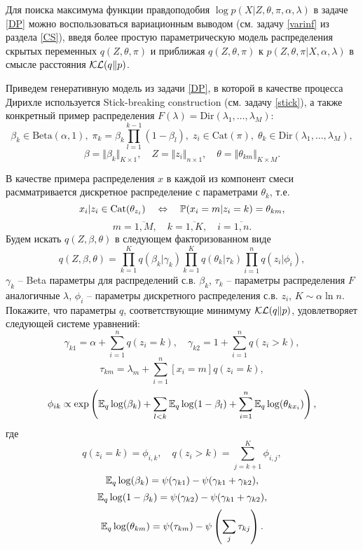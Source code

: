 \begin{problem}
Для поиска максимума функции правдоподобия $\log p(X | Z, \theta, \pi, \alpha, \lambda)$ в задаче \ref{DP} можно воспользоваться вариационным выводом (см. задачу \ref{varinf} из раздела \ref{CS}), введя более простую параметрическую модель распределения скрытых переменных $q(Z, \theta, \pi)$ и приближая $q(Z, \theta, \pi)$ к $p(Z, \theta, \pi| X, \alpha, \lambda)$ в смысле расстояния $\mathcal{KL}(q \Vert p)$.   

Приведем генеративную модель из задачи \ref{DP}, в которой в качестве процесса Дирихле используется Stick-breaking construction (см. задачу \ref{stick}), а также конкретный пример распределения $F(\lambda) = \mathrm{Dir}(\lambda_1,\ldots,\lambda_M)$: 
\[
\beta_k \in \mathrm{Beta}(\alpha, 1),
\;
\pi_k = \beta_k \prod \limits_{l=1}^{k-1} (1 - \beta_l), 
\;
z_i \in \mathrm{Cat}(\pi),
\;
\theta_k \in \mathrm{Dir}(\lambda_1,\ldots,\lambda_M),
\]
\[
\beta = \Vert \beta_k \Vert_{K \times 1}, \quad
Z = \Vert z_i \Vert_{n \times 1}, \quad
\theta = \Vert \theta_{km} \Vert_{K \times M}.
\]


В качестве примера распределения $x$ в каждой из компонент смеси расмматривается дискретное распределение с параметрами $\theta_k$, т.е.
\[
x_i|z_i \in \mathrm{Cat}(\theta_{z_i}) \quad 
\Leftrightarrow 
\quad
\mathrm{{\mathbb P}}(x_i = m | z_i = k) = \theta_{k m},  
\]
\[
m = \overline{1,M}, \quad k = \overline{1,K}, \quad
i = \overline{1,n}.
\]
Будем искать $q(Z, \beta, \theta)$ в следующем факторизованном виде
\[
q(Z, \beta, \theta) = \prod \limits_{k=1}^K q(\beta_k | \gamma_k) \prod \limits_{k=1}^K q(\theta_k | \tau_k) \prod \limits_{i=1}^n q(z_i | \phi_i),
\]
$\gamma_k$ -- Beta параметры для распределений с.в. $\beta_k$, $\tau_k$ -- параметры распределения $F$ аналогичные $\lambda$, $\phi_i$ -- параметры дискретного распределения с.в. $z_i$, $K \sim \alpha \ln n$. 
Покажите, что параметры $q$, соответствующие минимуму $\mathcal{KL}(q \Vert p)$, удовлетворяет следующей системе уравнений:
\[
\gamma_{k1} = \alpha + \sum_{i = 1}^n q(z_i = k), \quad
\gamma_{k2} = 1 + \sum_{i = 1}^n q(z_i > k), 
\]
\[
\tau_{km} = \lambda_m + \sum_{i = 1}^n [x_i = m] q(z_i = k),
\]
\[
\phi_{ik} \propto \exp \left( \mathrm{{\mathbb E}}_q \log (\beta_k) + \sum_{l < k} \mathrm{{\mathbb E}}_q \log (1 - \beta_l) + \sum_{i = 1}^n \mathrm{{\mathbb E}}_q \log (\theta_{kx_i}) 
\right),
\]
где
$$
q(z_i = k) = \phi_{i,k}, \quad q(z_i > k) = \sum \limits_{j = k+1}^K \phi_{i,j},
$$
$$
\mathrm{{\mathbb E}}_q \log (\beta_k) = \psi(\gamma_{k1}) - \psi(\gamma_{k1} + \gamma_{k2}), 
$$
$$
\mathrm{{\mathbb E}}_q \log (1- \beta_k) = \psi(\gamma_{k2}) - \psi(\gamma_{k1} + \gamma_{k2}), 
$$
$$
\mathrm{{\mathbb E}}_q \log (\theta_{km}) = \psi(\tau_{km}) - \psi\left(\sum_{j}\tau_{kj}\right). 
$$

\end{problem}






